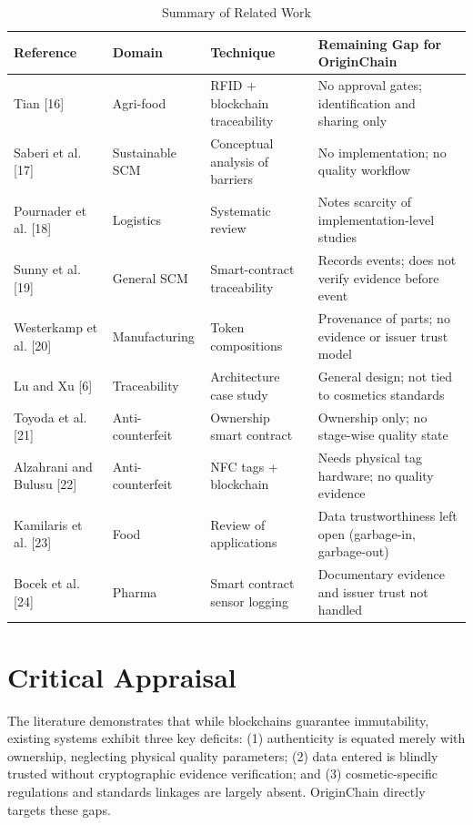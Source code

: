 \documentclass[12pt,a4paper]{report}
\begin{document}
\begin{table}[H]
\centering
\caption{Summary of Related Work}
\label{tab:lit_survey}
\small
\renewcommand{\arraystretch}{1.2}
\begin{tabularx}{\textwidth}{L{2.4cm} L{2.5cm} L{3.1cm} Y}
\toprule
\textbf{Reference} & \textbf{Domain} & \textbf{Technique} & \textbf{Remaining Gap for OriginChain} \\
\midrule
Tian [16] & Agri-food & RFID + blockchain traceability & No approval gates; identification and sharing only \\
Saberi et al. [17] & Sustainable SCM & Conceptual analysis of barriers & No implementation; no quality workflow \\
Pournader et al. [18] & Logistics & Systematic review & Notes scarcity of implementation-level studies \\
Sunny et al. [19] & General SCM & Smart-contract traceability & Records events; does not verify evidence before event \\
Westerkamp et al. [20] & Manufacturing & Token compositions & Provenance of parts; no evidence or issuer trust model \\
Lu and Xu [6] & Traceability & Architecture case study & General design; not tied to cosmetics standards \\
Toyoda et al. [21] & Anti-counterfeit & Ownership smart contract & Ownership only; no stage-wise quality state \\
Alzahrani and Bulusu [22] & Anti-counterfeit & NFC tags + blockchain & Needs physical tag hardware; no quality evidence \\
Kamilaris et al. [23] & Food & Review of applications & Data trustworthiness left open (garbage-in, garbage-out) \\
Bocek et al. [24] & Pharma & Smart contract sensor logging & Documentary evidence and issuer trust not handled \\
\bottomrule
\end{tabularx}
\end{table}

\section{Critical Appraisal}
The literature demonstrates that while blockchains guarantee immutability, existing systems exhibit three key deficits: (1) authenticity is equated merely with ownership, neglecting physical quality parameters; (2) data entered is blindly trusted without cryptographic evidence verification; and (3) cosmetic-specific regulations and standards linkages are largely absent. OriginChain directly targets these gaps.
\end{document}
